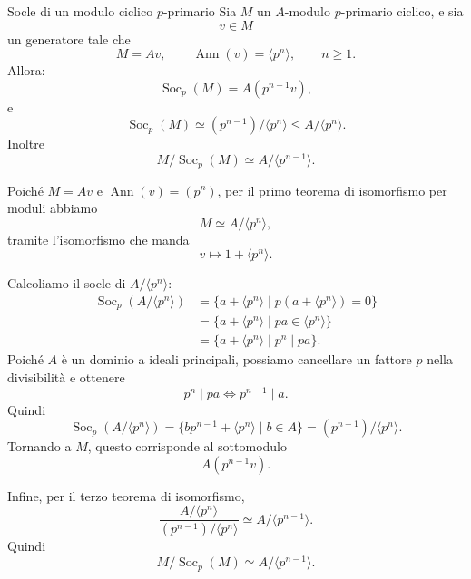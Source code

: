 \documentclass[a4paper]{article}
\begin{document}
\begin{radioactive}
\begin{snippetlemma}{Socle di un modulo ciclico \(p\)-primario}
    Sia \(M\) un \(A\)-modulo \(p\)-primario ciclico, e sia
    \[
        v\in M
    \]
    un generatore tale che
    \[
        M=Av,
        \qquad
        \operatorname{Ann}(v)=\langle p^n \rangle,
        \qquad
        n\geq 1.
    \]
    Allora:
    \[
        \operatorname{Soc}_p(M)=A(p^{n-1}v),
    \]
    e
    \[
        \operatorname{Soc}_p(M)\simeq (p^{n-1})/\langle p^n \rangle\leq A/\langle p^n \rangle.
    \]
    Inoltre
    \[
        M/\operatorname{Soc}_p(M)\simeq A/\langle p^{n-1} \rangle.
    \]
\end{snippetlemma}
\end{radioactive}

\begin{radioactive}
\begin{snippetproof}{}
    Poiché \(M=Av\) e \(\operatorname{Ann}(v)=(p^n)\), per il primo teorema di isomorfismo per moduli abbiamo
    \[
        M\simeq A/\langle p^n \rangle,
    \]
    tramite l'isomorfismo che manda
    \[
        v\longmapsto 1+\langle p^n \rangle.
    \]

    Calcoliamo il socle di \(A/\langle p^n \rangle\):
    \begin{align*}
        \operatorname{Soc}_p(A/\langle p^n \rangle)
        &=
        \{a+\langle p^n \rangle\mid p(a+\langle p^n \rangle)=0\} \\
        &=
        \{a+\langle p^n \rangle\mid pa\in\langle p^n \rangle\} \\
        &=
        \{a+\langle p^n \rangle\mid p^n\mid pa\}.
    \end{align*}
    Poiché \(A\) è un dominio a ideali principali, possiamo cancellare un fattore \(p\) nella divisibilità e ottenere
    \[
        p^n\mid pa
        \iff
        p^{n-1}\mid a.
    \]
    Quindi
    \[
        \operatorname{Soc}_p(A/\langle p^n \rangle)
        =
        \{bp^{n-1}+\langle p^n \rangle\mid b\in A\}
        =
        (p^{n-1})/\langle p^n \rangle.
    \]
    Tornando a \(M\), questo corrisponde al sottomodulo
    \[
        A(p^{n-1}v).
    \]

    Infine, per il terzo teorema di isomorfismo,
    \[
        \frac{A/\langle p^n \rangle}{(p^{n-1})/\langle p^n \rangle}
        \simeq
        A/\langle p^{n-1} \rangle.
    \]
    Quindi
    \[
        M/\operatorname{Soc}_p(M)\simeq A/\langle p^{n-1} \rangle.
    \]
\end{snippetproof}
\end{radioactive}
\end{document}
